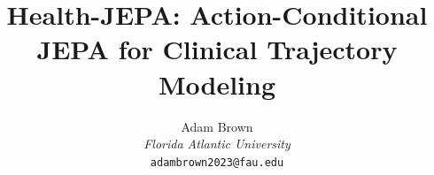 \usepackage[margin=1in]{geometry}
\usepackage[T1]{fontenc}
\usepackage[utf8]{inputenc}
\usepackage{lmodern} %
\usepackage{amsmath,amssymb,amsthm}
\usepackage[dvipsnames]{xcolor}
\usepackage{booktabs}
\usepackage{graphicx}
\usepackage{pgfplots}
\pgfplotsset{compat=1.18}
\usepackage{microtype}
\usepackage{enumitem}
\usepackage[labelfont=bf,font=small]{caption}
\usepackage{url}
\usepackage{natbib}
\usepackage{hyperref}
\usepackage[capitalise,noabbrev]{cleveref}
\usepackage{float} %
\usepackage{placeins} %


\newif\ifanon
\anonfalse
\newcommand{\anon}[2]{\ifanon #1\else #2\fi}

\newcommand{\sx}{\mathbf{s}_x}
\newcommand{\sy}{\mathbf{s}_y}
\newcommand{\syhat}{\hat{\mathbf{s}}_y}
\newcommand{\z}{z}
\newcommand{\ez}{\mathbf{e}_z}
\newcommand{\R}{\mathbb{R}}
\newcommand{\N}{\mathcal{N}}
\newcommand{\hba}{HbA$_{1c}$}
\newcommand{\predictiontask}{prediction task}
\newcommand{\macrocolhdr}{macro}

\title{\bfseries Health-JEPA: Action-Conditional JEPA for Clinical Trajectory Modeling}

\author{%
  \anon{Anonymous Authors}{%
    Adam Brown \\
    \textit{Florida Atlantic University} \\
    \texttt{adambrown2023@fau.edu}%
  }
}

